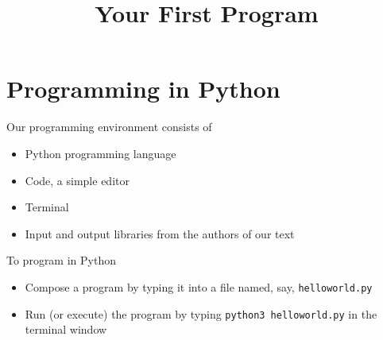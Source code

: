 \documentclass[8pt,a4paper,compress]{beamer}
\title{Your First Program}
\date{}
\begin{document}
\begin{frame}
\vfill
\titlepage
\end{frame}

\section{Programming in Python}
\begin{frame}[fragile]
\pause

Our programming environment consists of
\begin{itemize}
\pause
\item Python programming language  

\pause
\item Code, a simple editor

\pause
\item Terminal

\pause
\item Input and output libraries from the authors of our text
\end{itemize}
\end{frame}

\begin{frame}[fragile]
\pause

To program in Python
\begin{itemize}
\pause
\item Compose a program by typing it into a file named, say, \lstinline{helloworld.py}

\pause
\item Run (or execute) the program by typing \lstinline{python3 helloworld.py} in the terminal window
\end{itemize}

\begin{center}
\end{center}
\end{frame}
\end{document}
